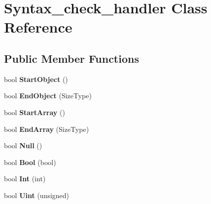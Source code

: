 \hypertarget{classSyntax__check__handler}{}\section{Syntax\+\_\+check\+\_\+handler Class Reference}
\label{classSyntax__check__handler}
\subsection*{Public Member Functions}
\begin{DoxyCompactItemize}
\item 
\mbox{\label{classSyntax__check__handler_aaeb51b7d2c6ed2f1359c465ab02c9876}} 
bool {\bfseries Start\+Object} ()
\item 
\mbox{\label{classSyntax__check__handler_a46fb2183ec6305e47af5ee4cf88c7bd7}} 
bool {\bfseries End\+Object} (Size\+Type)
\item 
\mbox{\label{classSyntax__check__handler_a822e0a836a5ad0b09dccf8aa0cd7594a}} 
bool {\bfseries Start\+Array} ()
\item 
\mbox{\label{classSyntax__check__handler_ac1796a5980eed8df4f891b5578bf33fc}} 
bool {\bfseries End\+Array} (Size\+Type)
\item 
\mbox{\label{classSyntax__check__handler_a9c842c8a9f074b2bba7ecdb4b562f9b0}} 
bool {\bfseries Null} ()
\item 
\mbox{\label{classSyntax__check__handler_a5ba7e7c2b516d43629ac4d095edf9358}} 
bool {\bfseries Bool} (bool)
\item 
\mbox{\label{classSyntax__check__handler_a7bb17fc65c1bb875957afeeefc3ca3ad}} 
bool {\bfseries Int} (int)
\item 
\mbox{\label{classSyntax__check__handler_a9309953fee01071edc11c7edc8b72f3c}} 
bool {\bfseries Uint} (unsigned)
\item 
\mbox{\label{classSyntax__check__handler_ab2ace55424ebba89ed2ea3eea4135466}} 

\end{DoxyCompactItemize}

